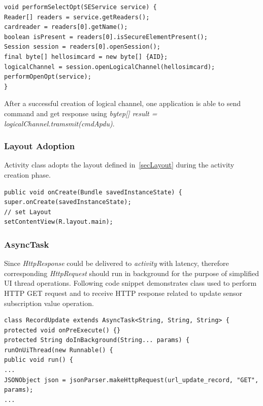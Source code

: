 \begin{Verbatim}[fontsize=\relsize{-1},frame=lines,framesep=4mm, label=\fbox{\small\emph{Service and logical channel Creation}}]
void performSelectOpt(SEService service) {
Reader[] readers = service.getReaders();
cardreader = readers[0].getName();
boolean isPresent = readers[0].isSecureElementPresent();
Session session = readers[0].openSession();
final byte[] hellosimcard = new byte[] {AID};
logicalChannel = session.openLogicalChannel(hellosimcard);
performOpenOpt(service);
}
\end{Verbatim}
After a successful creation of logical channel, one application is able to send command and get response using \emph{bytep[] result = logicalChannel.tramsmit(cmdApdu)}.
\subsubsection{Layout Adoption}
Activity class adopts the layout defined in~\ref{secLayout} during the activity creation phase.

\begin{Verbatim}[fontsize=\relsize{-1},frame=lines,framesep=4mm, label=\fbox{\small\emph{Layout Adoption}}]
public void onCreate(Bundle savedInstanceState) {
super.onCreate(savedInstanceState);
// set Layout
setContentView(R.layout.main);
\end{Verbatim}

\subsubsection{AsyncTask}
Since \emph{HttpResponse} could be delivered to \emph{activity} with latency, therefore corresponding \emph{HttpRequest} should run in background for the purpose of simplified UI thread operations. Following code snippet demonstrates class used to perform HTTP GET request and to receive HTTP response related to update sensor subscription value operation.
\begin{Verbatim}[fontsize=\relsize{-1},frame=lines,framesep=4mm, label=\fbox{\small\emph{AsyncTask HttpRequest}}]
class RecordUpdate extends AsyncTask<String, String, String> {
protected void onPreExecute() {}	
protected String doInBackground(String... params) {
runOnUiThread(new Runnable() {
public void run() {
...
JSONObject json = jsonParser.makeHttpRequest(url_update_record, "GET", params);
...
\end{Verbatim}
